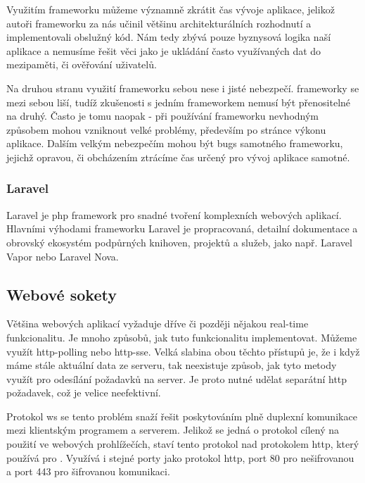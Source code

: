 Využitím \gls{framework}u můžeme významně zkrátit čas vývoje aplikace, jelikož autoři \gls{framework}u za nás učinil většinu architekturálních rozhodnutí a implementovali obslužný kód. Nám tedy zbývá pouze byznysová logika naší aplikace a nemusíme řešit věci jako je ukládání často využívaných dat do mezipaměti, či ověřování uživatelů.

Na druhou stranu využití \gls{framework}u sebou nese i jisté nebezpečí. \Gls{framework}y se mezi sebou liší, tudíž zkušenosti s jedním \gls{framework}em nemusí být přenositelné na druhý. Často je tomu naopak - při používání \gls{framework}u nevhodným způsobem mohou vzniknout velké problémy, především po stránce výkonu aplikace. Dalším velkým nebezpečím mohou být \glspl{bug} samotného \gls{framework}u, jejichž opravou, či obcházením ztrácíme čas určený pro vývoj aplikace samotné.

\subsubsection{Laravel}
\label{subsub:laravel}

Laravel\cite{laravel} je \acrshort{php} \gls{framework} pro snadné tvoření komplexních webových aplikací. Hlavními výhodami \gls{framework}u Laravel je propracovaná, detailní dokumentace a obrovský ekosystém podpůrných knihoven, projektů a služeb, jako např. Laravel Vapor\cite{laravel-vapor} nebo Laravel Nova\cite{laravel-nova}.

\subsection{Webové sokety}

Většina webových aplikací vyžaduje dříve či později nějakou \gls{real-time} funkcionalitu. Je mnoho způsobů, jak tuto funkcionalitu implementovat. Můžeme využít \Gls{http-polling}\cite{http-polling} nebo \Gls{http-sse}\cite{http-sse}. Velká slabina obou těchto přístupů je, že i když máme stále aktuální data ze serveru, tak neexistuje způsob, jak tyto metody využít pro odesílání požadavků na server. Je proto nutné udělat separátní \acrshort{http} požadavek, což je velice neefektivní.

Protokol \acrfull{ws}\cite{ws} se tento problém snaží řešit poskytováním plně duplexní komunikace mezi klientským programem a serverem. Jelikož se jedná o protokol cílený na použití ve webových prohlížečích, staví tento protokol nad protokolem \acrshort{http}, který používá pro . Využívá i stejné porty jako protokol \acrshort{http}, port 80 pro nešifrovanou a port 443 pro šifrovanou komunikaci.

